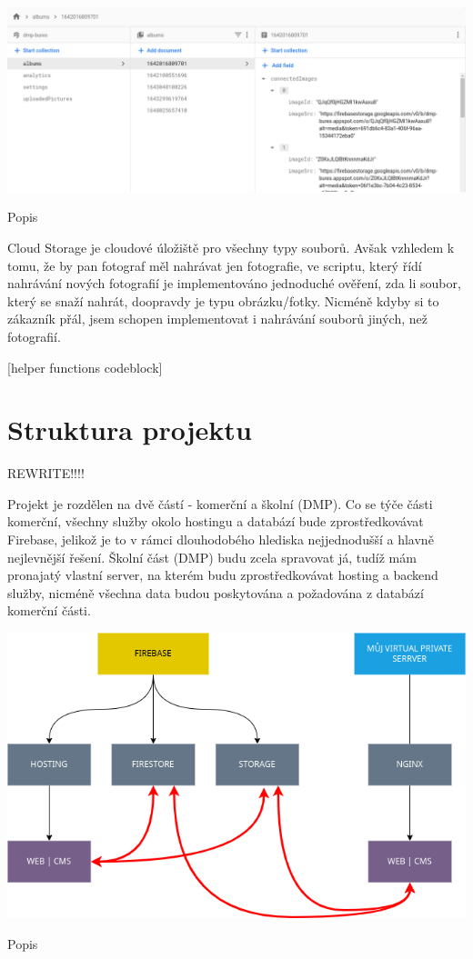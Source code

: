 \documentclass[12pt,a4paper]{report}
\begin{document}
  \vspace*{0.5cm}
  \noindent\includegraphics[width=\linewidth]{firestore.png}
  \begin{center}
    Popis
  \end{center}
  \vspace*{0.5cm}

  Cloud Storage je cloudové úložiště pro všechny typy souborů. Avšak vzhledem k tomu, že by pan
  fotograf měl nahrávat jen fotografie, ve scriptu, který řídí nahrávání nových fotografií je
  implementováno jednoduché ověření, zda li soubor, který se snaží nahrát, doopravdy je typu
  obrázku/fotky. Nicméně kdyby si to zákazník přál, jsem schopen implementovat i nahrávání
  souborů jiných, než fotografií.

  [helper functions codeblock]


  \chapter{Struktura projektu}
  REWRITE!!!!

  Projekt je rozdělen na dvě částí - komerční a školní (DMP). Co se týče části komerční, všechny
  služby okolo hostingu a databází bude zprostředkovávat Firebase, jelikož je to v rámci
  dlouhodobého hlediska nejjednodušší a hlavně nejlevnější řešení. Školní část (DMP) budu zcela
  spravovat já, tudíž mám pronajatý vlastní server, na kterém budu zprostředkovávat hosting a
  backend služby, nicméně všechna data budou poskytována a požadována z databází komerční
  části.
 
  \vspace*{0.5cm}
  \noindent\includegraphics[width=\linewidth]{project_structure.png}
  \begin{center}
    Popis
  \end{center}
  \vspace*{0.5cm}
\end{document}

